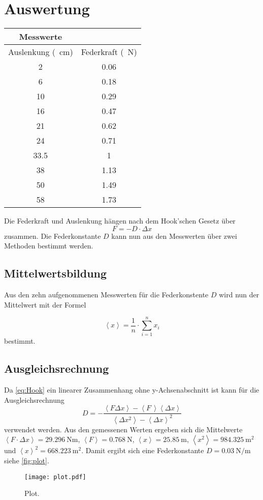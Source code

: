 \section{Auswertung}
\label{sec:Auswertung}
\begin{table}
  \centering
  \begin{tabular}{c c}
  \toprule
  Messwerte\\  
  \midrule 
  Auslenkung (\SI{}{\centi\meter}) & Federkraft (\SI{}{\newton})\\ 
  \midrule 
  2 & 0.06 \\
  6 & 0.18 \\
  10 & 0.29 \\
  16 & 0.47 \\
  21 & 0.62 \\
  24 & 0.71 \\
  33.5 & 1 \\
  38 & 1.13 \\
  50 & 1.49 \\
  58 & 1.73 \\ 
  \bottomrule
  \end{tabular}
\end{table} \noindent
Die Federkraft und Auslenkung hängen nach dem Hook'schen Gesetz über
\begin{equation}
  \label{eq:Hook}
  F = - D \cdot \Delta x
\end{equation}
zusammen.
Die Federkonstante $D$ kann nun aus den Messwerten über zwei Methoden bestimmt werden.

\subsection{Mittelwertsbildung}
Aus den zehn aufgenommenen Messwerten für die Federkonstente $D$ wird nun der Mittelwert mit der Formel

\begin{equation}
  \label{eq:Mittelwert}
  \left< x \right> = \frac{1}{n} \cdot \sum_{i=1}^{n} x_i
\end{equation}
bestimmt. 

\subsection{Ausgleichsrechnung}

Da \eqref{eq:Hook} ein linearer Zusammenhang ohne y-Achsenabschnitt ist kann für die Ausgleichsrechnung
\begin{equation}
  \label{eq:Lin-Ausgleich}
  D = - \frac
  {\left< F \Delta x \right> - \left< F \, \right> \left< \Delta x \right>}
  {\left< \Delta x^2 \right> - \left< \Delta x \right> ^2}
\end{equation}
verwendet werden.
Aus den gemessenen Werten ergeben sich die Mittelwerte $\left< F \cdot \Delta x \right> = \SI{29.296}{\newton\meter}$, $\left< F \right> = \SI{0.768}{\newton}$, $\left< x \right> = \SI{25.85}{\meter}$, $\left< x^2 \right> = \SI{984.325}{\meter\squared}$ und $\left< x \right> ^2 = \SI{668.223}{\meter\squared}$.
Damit ergibt sich eine Federkonstante $D=\SI{0.03}{\newton\per\meter}$ siehe \autoref{fig:plot}.

\begin{figure}
  \centering
  \texttt{[image: plot.pdf]}
  \caption{Plot.}
  \label{fig:plot}
\end{figure}

